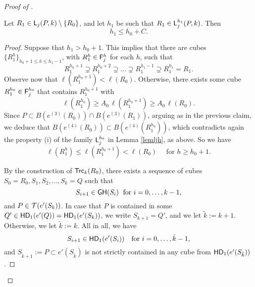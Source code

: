 \begin{proof}[Proof of ]
\begin{claim}
Let $R_1\in{\mathsf{L}}_j(P,k)\setminus\{R_0\}$, and let $h_1$ be such that $R_1\in {\mathsf{L}}_j^{h_1}(P,k)$. 
Then 
\begin{equation}\label{eqclaimh1}
h_1\leq h_0+C.
\end{equation}
\end{claim}

\begin{proof}
Suppose that $h_1> h_0+1$. This implies that there are cubes
$\{R_1^h\}_{h_0+1\leq h \leq h_1-1}$, with $R_1^h\in{\mathsf{F}}_j^h$ for each $h$, such that
$$R_1^{h_0+1}\supsetneq R_1^{h_0+2}\supsetneq\ldots \supsetneq R_1^{h_1-1}\supsetneq R_1^{h_1}=R_1.$$
Observe now that $\ell(R_1^{h_0+1})< \ell(R_0)$. Otherwise, there exists some cube
$R_1^{h_0}\in{\mathsf{F}}_j^{h_0}$ that contains $R_1^{h_0+1}$ with 
$$\ell(R_1^{h_0})\geq A_0\,\ell(R_1^{h_0+1})\geq A_0\,\ell(R_0).$$
Since $P \subset  B(e^{(3)}(R_0)) \cap B(e^{(3)}(R_1))$, arguing as in the previous claim, we deduce that
$B(e^{(4)}(R_0))\subset B(e^{(4)}(R_1^{h_0}))$, which contradicts again the property (i) of the family ${\mathsf{L}}_j^{h_0}$ in Lemma \ref{lemljh}, as above. So we have
$$\ell(R_1^h)\leq \ell(R_1^{h_0+1})< \ell(R_0)\quad \mbox{ for $h\geq h_0+1$.}$$

By the construction of ${\mathsf{Trc}}_k(R_0)$, there exists a sequence of cubes
$S_0=R_0, S_1, S_2, \ldots, S_k=Q$ such that 
$$ S_{i+1}\in {\mathsf{GH}}(S_i)\; \mbox{ for $i=0,\ldots,k-1$,}$$
and $P\in{\mathcal T}(e'(S_{k}))$. In case that $P$ is contained in some $Q'\in{\mathsf{HD}}_1(e'(Q))={\mathsf{HD}}_1(e'(S_k))$, we write $S_{k+1}=Q'$, and we let $\tilde k:=k+1$. Otherwise, we let $\tilde k:=k$. All in all, we have
\begin{equation}\label{eq:bla1}
	S_{i+1}\in{\mathsf{HD}}_1(e'(S_i))\quad\text{for $i=0,\dots,\tilde k-1$},
\end{equation}
and $S_{\tilde{k}+1}:=P\subset e'(S_{\tilde k})$ is not strictly contained in any cube from ${\mathsf{HD}}_1(e'(S_{\tilde k}))$.


\end{proof}
\end{proof}
